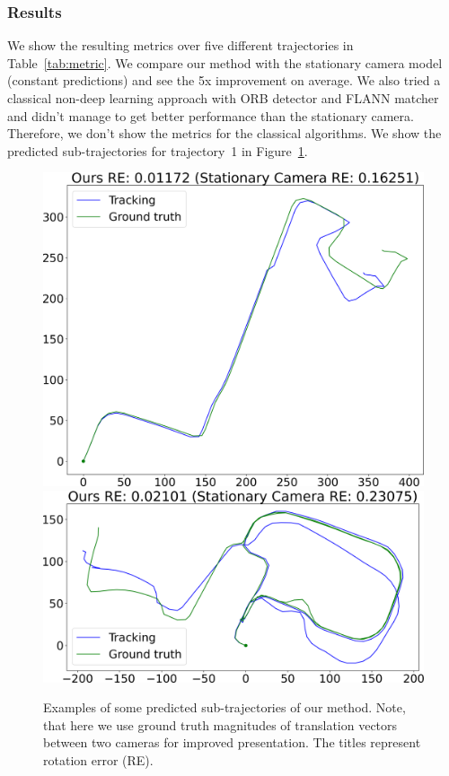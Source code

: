 \documentclass{article}
\begin{document}
\subsubsection{Results}

We show the resulting metrics over five different trajectories in
Table~\ref{tab:metric}. We compare our method with the stationary camera model
(constant predictions) and see the 5x improvement on average. We also tried a
classical non-deep learning approach with ORB detector and FLANN matcher and
didn't manage to get better performance than the stationary camera. Therefore,
we don't show the metrics for the classical algorithms. We show the predicted
sub-trajectories for trajectory~1 in Figure~\ref{fig:traj1}.

\begin{figure}
    \centering
    \includegraphics[width=1.0\linewidth]{./assets/traj1_07.png} \\
    \bigskip
    \includegraphics[width=1.0\linewidth]{./assets/traj1_11.png}
    \caption{Examples of some predicted sub-trajectories of our method. Note,
    that here we use ground truth magnitudes of translation vectors between two
    cameras for improved presentation. The titles represent rotation error
    (RE).}
    \label{fig:traj1}
\end{figure}
\end{document}
